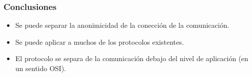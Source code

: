 \documentclass{beamer}
\begin{document}
\begin{frame}
    \frametitle{Conclusiones}
    \begin{itemize}
        \item Se puede separar la anonimicidad de la conección de la comunicación.
        \item Se puede aplicar a muchos de los protocolos existentes.
        \item El protocolo se separa de la comunicación debajo del nivel de aplicación (en un sentido OSI).
    \end{itemize}
\end{frame}
\end{document}
